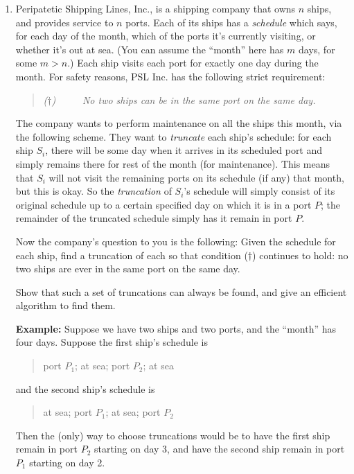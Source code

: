 \documentclass[12pt]{article}
\begin{document}
\begin{enumerate}
{}


\item

Peripatetic Shipping Lines, Inc., is a shipping
company that owns $n$ ships, and provides service to $n$ ports.
Each of its ships has a {\em schedule}
which says, for each day of the month,
which of the ports it's currently visiting, or whether it's out at sea.
(You can assume the ``month'' here has $m$ days, for some $m > n$.)
Each ship visits each port for exactly one day during the month.
For safety reasons, PSL Inc. has the following strict requirement:
\begin{quote}
{\em ($\dagger$) ~~~~ No two ships can be in the same port on the same day.}
\end{quote}

The company wants to perform maintenance on all the ships this
month, via the following scheme.
They want to {\em truncate} each ship's schedule:
for each ship $S_i$, there will be some day when it arrives
in its scheduled port and simply remains there for rest of
the month (for maintenance).
This means that $S_i$ will not visit the remaining ports
on its schedule (if any) that month, but this is okay.
So the {\em truncation} of $S_i$'s schedule will simply
consist of its original schedule up to a certain specified
day on which it is in a port $P$; the remainder of the
truncated schedule simply has it remain in port $P$.

Now the company's question to you is the following:
Given the schedule for each ship, find a truncation
of each so that condition ($\dagger$) continues to hold:
no two ships are ever in the same port on the same day.

Show that such a set of truncations can always be found,
and give an efficient algorithm to find them.

{\bf Example:} Suppose we have two ships and two ports,
and the ``month'' has four days.
Suppose the first ship's schedule is
\begin{quote}
port $P_1$; at sea; port $P_2$; at sea
\end{quote}
and the second ship's schedule is
\begin{quote}
at sea; port $P_1$; at sea; port $P_2$
\end{quote}
Then the (only) way to choose truncations would be
to have the first ship remain in port $P_2$ starting on day 3,
and have the second ship remain in port $P_1$ starting on day 2.


\end{enumerate}
\end{document}
